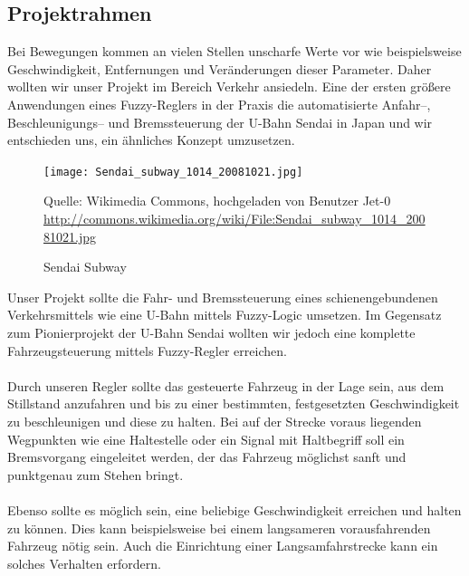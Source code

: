 \documentclass[10pt,a4paper]{article}
\begin{document}
\subsection{Projektrahmen}
Bei Bewegungen kommen an vielen Stellen unscharfe Werte vor wie beispielsweise Geschwindigkeit, Entfernungen und Veränderungen dieser Parameter. Daher wollten wir unser Projekt im Bereich Verkehr ansiedeln.
Eine der ersten größere Anwendungen eines Fuzzy-Reglers in der Praxis die automatisierte Anfahr--, Beschleunigungs-- und Bremssteuerung der U-Bahn Sendai in Japan und wir entschieden uns, ein ähnliches Konzept umzusetzen.

\begin{figure}[htb]
\begin{center}
\leavevmode
\texttt{[image: Sendai\_subway\_1014\_20081021.jpg]}
\caption[Sendai Subway]{Sendai Subway}
\label{Sendai Subway}

\begin{footnotesize}
Quelle: Wikimedia Commons, hochgeladen von Benutzer Jet-0
\url{http://commons.wikimedia.org/wiki/File:Sendai_subway_1014_20081021.jpg}
\end{footnotesize}

\end{center}
\end{figure}

Unser Projekt sollte die Fahr- und Bremssteuerung eines schienengebundenen Verkehrsmittels wie eine U-Bahn mittels Fuzzy-Logic umsetzen.
Im Gegensatz zum Pionierprojekt der U-Bahn Sendai wollten wir jedoch eine komplette Fahrzeugsteuerung mittels Fuzzy-Regler erreichen.
\paragraph{}
Durch unseren Regler sollte das gesteuerte Fahrzeug in der Lage sein, aus dem Stillstand anzufahren und bis zu einer bestimmten, festgesetzten Geschwindigkeit zu beschleunigen und diese zu halten. Bei auf der Strecke voraus liegenden Wegpunkten wie eine Haltestelle oder ein Signal mit Haltbegriff soll ein Bremsvorgang eingeleitet werden, der das Fahrzeug möglichst sanft und punktgenau zum Stehen bringt.
\paragraph{}
Ebenso sollte es möglich sein, eine beliebige Geschwindigkeit erreichen und halten zu können. Dies kann beispielsweise bei einem langsameren vorausfahrenden Fahrzeug nötig sein. Auch die Einrichtung einer Langsamfahrstrecke kann ein solches Verhalten erfordern.
\end{document}
